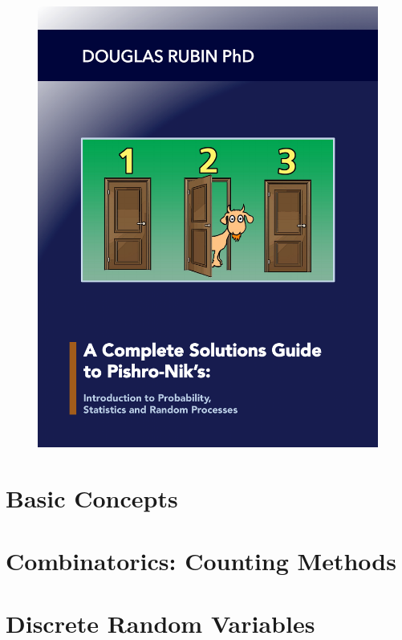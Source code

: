 \documentclass[11pt]{book}
\begin{document}

	\begin{figure}[h]
\centering
\vspace*{-2.54cm}  
\hspace*{-2.63cm}  
     \includegraphics[totalheight=11in]{book_cover/book_cover.pdf}
	\end{figure}


{}  
\tableofcontents

\chapter{Basic Concepts}


\chapter{Combinatorics: Counting Methods}


\chapter{Discrete Random Variables}

\end{document}
